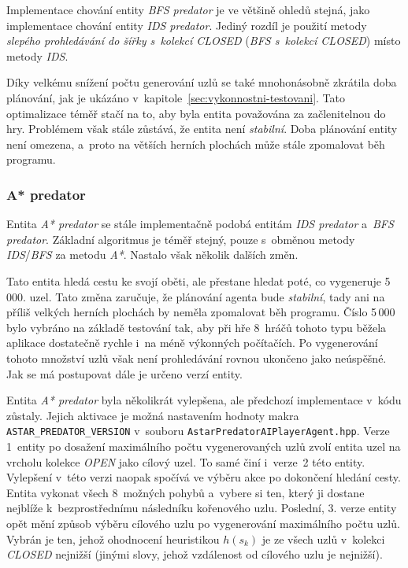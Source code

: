 Implementace chování entity \emph{BFS predator} je ve většině ohledů stejná, jako implementace chování entity \emph{IDS predator}. Jediný rozdíl je použití metody \emph{slepého prohledávání do šířky s~kolekcí CLOSED} (\emph{BFS s~kolekcí CLOSED}) místo metody \emph{IDS}.

Díky velkému snížení počtu generování uzlů se také mnohonásobně zkrátila doba plánování, jak je ukázáno v~kapitole~\ref{sec:vykonnostni-testovani}. Tato optimalizace téměř stačí na to, aby byla entita považována za začlenitelnou do hry. Problémem však stále zůstává, že entita není \emph{stabilní}. Doba plánování entity není omezena, a~proto na větších herních plochách může stále zpomalovat běh programu.

\subsubsection*{A* predator}

Entita \emph{A* predator} se stále implementačně podobá entitám \emph{IDS predator} a~\emph{BFS predator}. Základní algoritmus je téměř stejný, pouze s~obměnou metody \emph{IDS}/\emph{BFS} za metodu \emph{A*}. Nastalo však několik dalších změn.

Tato entita hledá cestu ke svojí oběti, ale přestane hledat poté, co vygeneruje 5\,000. uzel. Tato změna zaručuje, že plánování agenta bude \emph{stabilní}, tady ani na příliš velkých herních plochách by neměla zpomalovat běh programu. Číslo 5\,000 bylo vybráno na základě testování tak, aby při hře 8~hráčů tohoto typu běžela aplikace dostatečně rychle i~na méně výkonných počítačích. Po vygenerování tohoto množství uzlů však není prohledávání rovnou ukončeno jako neúspěšné. Jak se má postupovat dále je určeno verzí entity.

Entita \emph{A* predator} byla několikrát vylepšena, ale předchozí implementace v~kódu zůstaly. Jejich aktivace je možná nastavením hodnoty makra \texttt{ASTAR\_PREDATOR\_VERSION} v~souboru \texttt{AstarPredatorAIPlayerAgent.hpp}. Verze 1~entity po dosažení maximálního počtu vygenerovaných uzlů zvolí entita uzel na vrcholu kolekce \emph{OPEN} jako cílový uzel. To samé činí i~verze~2 této entity. Vylepšení v~této verzi naopak spočívá ve výběru akce po dokončení hledání cesty. Entita  vykonat všech 8~možných pohybů a~vybere si ten, který ji dostane nejblíže k~bezprostřednímu následníku kořenového uzlu. Poslední, 3. verze entity opět mění způsob výběru cílového uzlu po vygenerování maximálního počtu uzlů. Vybrán je ten, jehož ohodnocení heuristikou $h(s_k)$ je ze všech uzlů v~kolekci \emph{CLOSED} nejnižší (jinými slovy, jehož vzdálenost od cílového uzlu je nejnižší).

